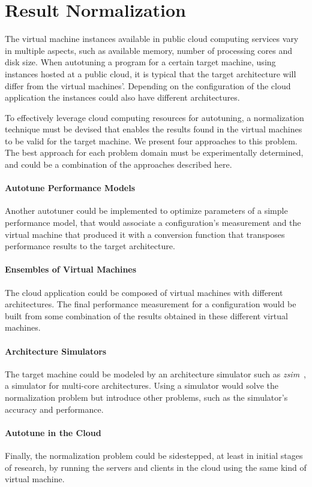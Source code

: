 \section{Result Normalization}
\label{sec:norm}

The virtual machine instances available in public cloud computing services
vary in multiple aspects, such as available memory, number of processing cores
and disk size.
When autotuning a program for a certain target machine, using instances
hosted at a public cloud, it is typical that the target architecture will
differ from the virtual machines'. Depending on the configuration of the
cloud application the instances could also have different architectures.

To effectively leverage cloud computing resources for autotuning, a
normalization technique must be devised that enables the results found in the
virtual machines to be valid for the target machine.  We present four
approaches to this problem. The best approach for each problem domain must be
experimentally determined, and could be a combination of the approaches
described here.

\paragraph{Autotune Performance Models}
Another autotuner could be implemented to optimize parameters of a simple
performance model, that would associate a configuration's measurement and the
virtual machine that produced it with a conversion function that transposes
performance results to the target architecture.

\paragraph{Ensembles of Virtual Machines}
The cloud application could be composed of virtual machines with different
architectures. The final performance measurement for a configuration would be
built from some combination of the results obtained in these different virtual
machines.

\paragraph{Architecture Simulators} 
The target machine could be modeled by an architecture simulator such as
\emph{zsim}~\cite{sanchez2013zsim}, a simulator for multi-core architectures.
Using a simulator would solve the normalization problem but introduce other
problems, such as the simulator's accuracy and performance.

\paragraph{Autotune in the Cloud}
Finally, the normalization problem could be sidestepped, at least in initial
stages of research, by running the servers and clients in the cloud using
the same kind of virtual machine.
